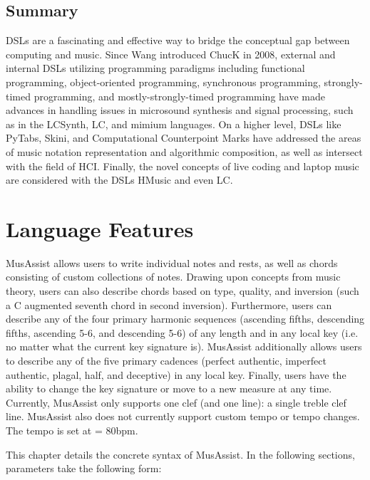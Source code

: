 \documentclass{report}
\newcommand\param[1]{\textttu{<#1>}}
\begin{document}
\section{Summary}
DSLs are a fascinating and effective way to bridge the conceptual gap between computing and music. Since Wang introduced ChucK in 2008, external and internal DSLs utilizing programming paradigms including functional programming, object-oriented programming, synchronous programming, strongly-timed programming, and mostly-strongly-timed programming have made advances in handling issues in microsound synthesis and signal processing, such as in the LCSynth, LC, and mimium languages. On a higher level, DSLs like PyTabs, Skini, and Computational Counterpoint Marks have addressed the areas of music notation representation and algorithmic composition, as well as intersect with the field of HCI. Finally, the novel concepts of live coding and laptop music are considered with the DSLs HMusic and even LC. 

\chapter{Language Features}
\label{chap:langfeatures}

MusAssist allows users to write individual notes and rests, as well as chords consisting of custom collections of notes. Drawing upon concepts from music theory, users can also describe chords based on type, quality, and inversion (such a C augmented seventh chord in second inversion). Furthermore, users can describe any of the four primary harmonic sequences (ascending fifths, descending fifths, ascending 5-6, and descending 5-6) of any length and in any local key (i.e. no matter what the current key signature is). MusAssist additionally allows users to describe any of the five primary cadences (perfect authentic, imperfect authentic, plagal, half, and deceptive) in any local key. Finally, users have the ability to change the key signature or move to a new measure at any time. Currently, MusAssist only supports one clef (and one line): a single treble clef line. MusAssist also does not currently support custom tempo or tempo changes. The tempo is set at \musQuarter\;= 80bpm.
 
This chapter details the concrete syntax of MusAssist. In the following sections, parameters take the following form: \param{PARAMETER}
\end{document}
